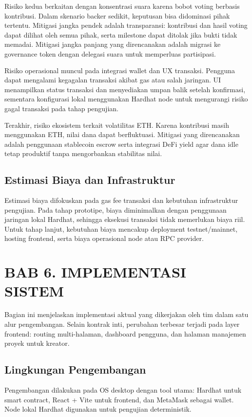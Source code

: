 \documentclass[12pt]{article}
\begin{document}
Risiko kedua berkaitan dengan konsentrasi suara karena bobot voting berbasis kontribusi. Dalam skenario backer sedikit, keputusan bisa didominasi pihak tertentu. Mitigasi jangka pendek adalah transparansi: kontribusi dan hasil voting dapat dilihat oleh semua pihak, serta milestone dapat ditolak jika bukti tidak memadai. Mitigasi jangka panjang yang direncanakan adalah migrasi ke governance token dengan delegasi suara untuk memperluas partisipasi.

Risiko operasional muncul pada integrasi wallet dan UX transaksi. Pengguna dapat mengalami kegagalan transaksi akibat gas atau salah jaringan. UI menampilkan status transaksi dan menyediakan umpan balik setelah konfirmasi, sementara konfigurasi lokal menggunakan Hardhat node untuk mengurangi risiko gagal transaksi pada tahap pengujian.

Terakhir, risiko ekosistem terkait volatilitas ETH. Karena kontribusi masih menggunakan ETH, nilai dana dapat berfluktuasi. Mitigasi yang direncanakan adalah penggunaan stablecoin escrow serta integrasi DeFi yield agar dana idle tetap produktif tanpa mengorbankan stabilitas nilai.

\subsection{Estimasi Biaya dan Infrastruktur}
Estimasi biaya difokuskan pada gas fee transaksi dan kebutuhan infrastruktur pengujian. Pada tahap prototipe, biaya diminimalkan dengan penggunaan jaringan lokal Hardhat, sehingga eksekusi transaksi tidak memerlukan biaya riil. Untuk tahap lanjut, kebutuhan biaya mencakup deployment testnet/mainnet, hosting frontend, serta biaya operasional node atau RPC provider.

\section{BAB 6. IMPLEMENTASI SISTEM}
Bagian ini menjelaskan implementasi aktual yang dikerjakan oleh tim dalam satu alur pengembangan. Selain kontrak inti, perubahan terbesar terjadi pada layer frontend: routing multi-halaman, dashboard pengguna, dan halaman manajemen proyek untuk kreator.

\subsection{Lingkungan Pengembangan}
Pengembangan dilakukan pada OS desktop dengan tool utama: Hardhat untuk smart contract, React + Vite untuk frontend, dan MetaMask sebagai wallet. Node lokal Hardhat digunakan untuk pengujian deterministik.
\end{document}
